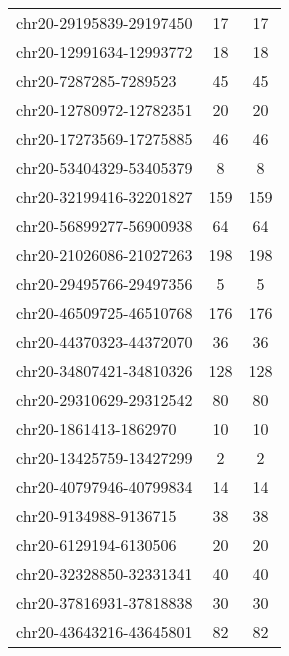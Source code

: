 \begin{longtable}{lSS}
	chr20-29195839-29197450 & 17     & 17                                        \\
	chr20-12991634-12993772 & 18     & 18                                        \\
	chr20-7287285-7289523   & 45     & 45                                        \\
	chr20-12780972-12782351 & 20     & 20                                        \\
	chr20-17273569-17275885 & 46     & 46                                        \\
	chr20-53404329-53405379 & 8      & 8                                         \\
	chr20-32199416-32201827 & 159    & 159                                       \\
	chr20-56899277-56900938 & 64     & 64                                        \\
	chr20-21026086-21027263 & 198    & 198                                       \\
	chr20-29495766-29497356 & 5      & 5                                         \\
	chr20-46509725-46510768 & 176    & 176                                       \\
	chr20-44370323-44372070 & 36     & 36                                        \\
	chr20-34807421-34810326 & 128    & 128                                       \\
	chr20-29310629-29312542 & 80     & 80                                        \\
	chr20-1861413-1862970   & 10     & 10                                        \\
	chr20-13425759-13427299 & 2      & 2                                         \\
	chr20-40797946-40799834 & 14     & 14                                        \\
	chr20-9134988-9136715   & 38     & 38                                        \\
	chr20-6129194-6130506   & 20     & 20                                        \\
	chr20-32328850-32331341 & 40     & 40                                        \\
	chr20-37816931-37818838 & 30     & 30                                        \\
	chr20-43643216-43645801 & 82     & 82                                        \\

\end{longtable}
